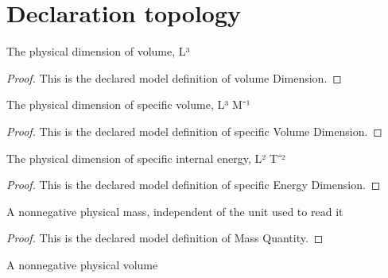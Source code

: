\section{Declaration topology}
\begin{definition}
  \label{def:physics:phyx-mini-0464:phyxminiproblems-problemphyxmini0464-volumedimension}
  The physical dimension of volume, L³
\end{definition}
\begin{proof}
  This is the declared model definition of volume Dimension.
\end{proof}
\begin{definition}
  \label{def:physics:phyx-mini-0464:phyxminiproblems-problemphyxmini0464-specificvolumedimension}
  The physical dimension of specific volume, L³ M⁻¹
\end{definition}
\begin{proof}
  This is the declared model definition of specific Volume Dimension.
\end{proof}
\begin{definition}
  \label{def:physics:phyx-mini-0464:phyxminiproblems-problemphyxmini0464-specificenergydimension}
  The physical dimension of specific internal energy, L² T⁻²
\end{definition}
\begin{proof}
  This is the declared model definition of specific Energy Dimension.
\end{proof}
\begin{definition}
  \label{def:physics:phyx-mini-0464:phyxminiproblems-problemphyxmini0464-massquantity}
  A nonnegative physical mass, independent of the unit used to read it
\end{definition}
\begin{proof}
  This is the declared model definition of Mass Quantity.
\end{proof}
\begin{definition}
  \label{def:physics:phyx-mini-0464:phyxminiproblems-problemphyxmini0464-volumequantity}
  A nonnegative physical volume
\end{definition}
